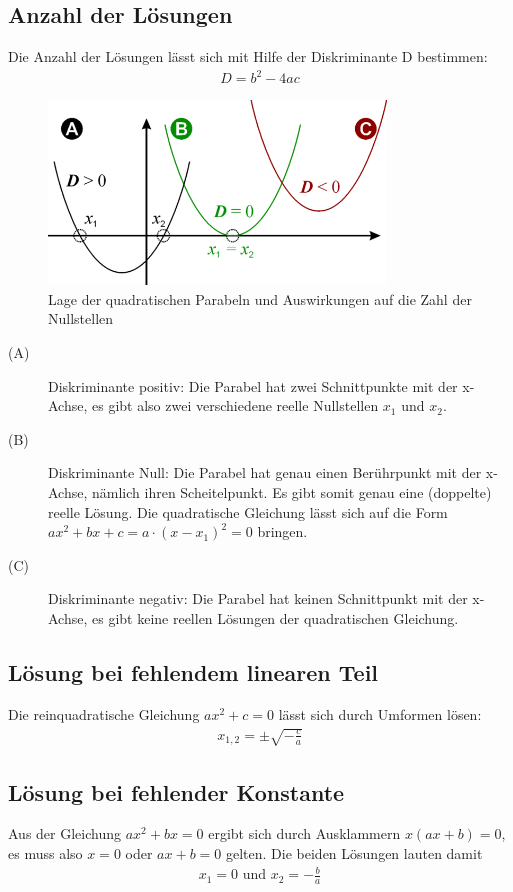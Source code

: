 \documentclass[a4paper]{article}
\begin{document}
\subsection{Anzahl der Lösungen}
Die Anzahl der Lösungen lässt sich mit Hilfe der Diskriminante D  bestimmen:
\begin{align*}
D = b^{2}-4ac
\end{align*}
\begin{figure}[h!]
\centering
\includegraphics[width=0.8\textwidth]{images/diskriminante.png}
\caption{\label{fig:diskriminante}Lage der quadratischen Parabeln und Auswirkungen auf die Zahl der Nullstellen}
\end{figure}
\begin{description}
\item[(A)] Diskriminante positiv: Die Parabel hat zwei Schnittpunkte mit der x-Achse, es gibt also zwei verschiedene reelle Nullstellen $x_{1}$ und $x_{2}$.
\item[(B)] Diskriminante Null: Die Parabel hat genau einen Berührpunkt mit der x-Achse, nämlich ihren Scheitelpunkt. Es gibt somit genau eine (doppelte) reelle Lösung. Die quadratische Gleichung lässt sich auf die Form $ax^2 + bx + c = a \cdot (x - x_1)^2 = 0$ bringen.
\item[(C)] Diskriminante negativ: Die Parabel hat keinen Schnittpunkt mit der x-Achse, es gibt keine reellen Lösungen der quadratischen Gleichung.
\end{description}

\subsection{Lösung bei fehlendem linearen Teil}
Die reinquadratische Gleichung $ax^{2}+c=0$ lässt sich durch Umformen lösen:
\begin{align*}
x_{1,2} = \pm \sqrt{-\frac{c}{a}}
\end{align*}
\subsection{Lösung bei fehlender Konstante}
Aus der Gleichung $ax^{2} + bx = 0$ ergibt sich durch Ausklammern $x(ax+b) = 0$, es muss also $x = 0$ oder $ax+b=0$ gelten. Die beiden Lösungen lauten damit
\begin{align*}
x_{1} = 0 \text{ und } x_{2}=-\frac{b}{a}
\end{align*}
\end{document}
